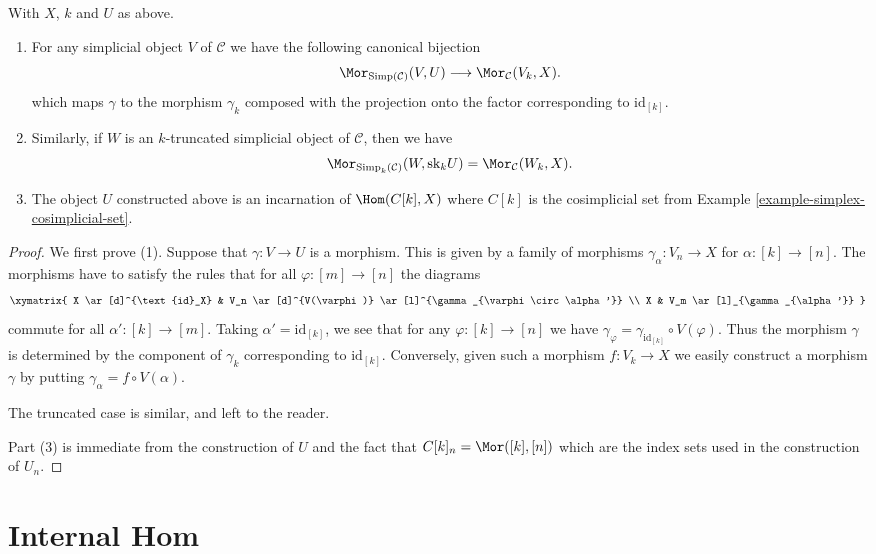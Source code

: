 \begin{lemma}
\label{lemma-morphism-into-product}
With $X$, $k$ and $U$ as above.
\begin{enumerate}
\item For any simplicial object $V$ of
$\mathcal{C}$ we have the following
canonical bijection
$$
\Mor_{\text{Simp}(\mathcal{C})}(V, U)
\longrightarrow
\Mor_\mathcal{C}(V_k, X).
$$
which maps $\gamma$ to the morphism $\gamma_k$ composed with
the projection onto the factor corresponding to $\text{id}_{[k]}$.
\item Similarly, if $W$ is an $k$-truncated simplicial object
of $\mathcal{C}$, then we have
$$
\Mor_{\text{Simp}_k(\mathcal{C})}(W, \text{sk}_k U)
=
\Mor_\mathcal{C}(W_k, X).
$$
\item The object $U$ constructed above is an
incarnation of $\Hom(C[k], X)$ where $C[k]$ is the cosimplicial set from
Example \ref{example-simplex-cosimplicial-set}.
\end{enumerate}
\end{lemma}

\begin{proof}
We first prove (1).
Suppose that $\gamma : V \to U$ is a morphism.
This is given by a family of morphisms
$\gamma_{\alpha} : V_n \to X$ for $\alpha : [k] \to [n]$.
The morphisms have to satisfy the
rules that for all $\varphi : [m] \to [n]$ the diagrams
$$
\xymatrix{
X \ar[d]^{\text{id}_X} &
V_n \ar[d]^{V(\varphi)}
\ar[l]^{\gamma_{\varphi \circ \alpha'}} \\
X &
V_m \ar[l]_{\gamma_{\alpha'}}
}
$$
commute for all $\alpha' : [k] \to [m]$.
Taking $\alpha' = \text{id}_{[k]}$, we see that
for any $\varphi : [k] \to [n]$ we have $\gamma_\varphi =
\gamma_{\text{id}_{[k]}} \circ V(\varphi)$. Thus the morphism
$\gamma$ is determined by the component of $\gamma_k$
corresponding to $\text{id}_{[k]}$. Conversely,
given such a morphism $f : V_k \to X$ we easily
construct a morphism $\gamma$ by putting
$\gamma_\alpha = f \circ V(\alpha)$.

\medskip\noindent
The truncated case is similar, and left to the reader.

\medskip\noindent
Part (3) is immediate from the construction of $U$ and the
fact that $C[k]_n = \Mor([k], [n])$ which are the index sets
used in the construction of $U_n$.
\end{proof}




\section{Internal Hom}
\label{section-internal-hom}

